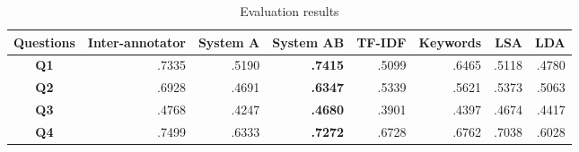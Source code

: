 \begin{table}
  \centering
  \begin{tabular}{ c r r r r r r r }
    \hline
	Questions &
	Inter-annotator &
	System A &
	System AB &
	TF-IDF &
	Keywords &
	LSA &
	LDA \\
    \hline
	\textbf{Q1} & .7335 & .5190 & \textbf{.7415} & .5099 & .6465 & .5118 & .4780 \\

	\textbf{Q2} & .6928 & .4691 & \textbf{.6347} & .5339 & .5621 & .5373 & .5063 \\

	\textbf{Q3} & .4768 & .4247 & \textbf{.4680} & .3901 & .4397 & .4674 & .4417 \\

	\textbf{Q4} & .7499 & .6333 & \textbf{.7272} & .6728 & .6762 & .7038 & .6028 \\

%
    \hline
  \end{tabular}
  \caption{Evaluation results}
  \label{tab:results}
\end{table}







